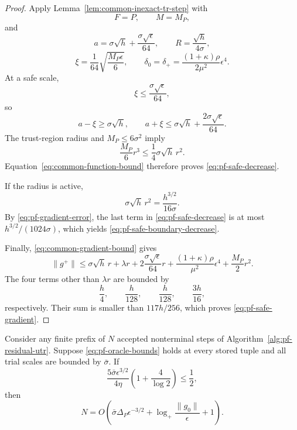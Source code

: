 \begin{proof}
Apply Lemma~\ref{lem:common-inexact-tr-step} with
\[
    F=P,
    \qquad
    M=M_P,
\]
and
\[
    a
    =
    \sigma\sqrt h
    +
    \frac{\sigma\sqrt\epsilon}{64},
    \qquad
    R
    =
    \frac{\sqrt h}{4\sigma},
\]
\[
    \xi
    =
    \frac1{64}
    \sqrt{\frac{M_P\epsilon}{6}},
    \qquad
    \delta_0=\delta_+
    =
    \frac{(1+\kappa)\rho}{2\mu^2}\epsilon^4.
\]
At a safe scale,
\[
    \xi
    \le
    \frac{\sigma\sqrt\epsilon}{64},
\]
so
\[
    a-\xi\ge\sigma\sqrt h,
    \qquad
    a+\xi
    \le
    \sigma\sqrt h
    +
    \frac{2\sigma\sqrt\epsilon}{64}.
\]
The trust-region radius and
$M_P\le6\sigma^2$ imply
\[
    \frac{M_P}{6}r^3
    \le
    \frac14\sigma\sqrt h\,r^2.
\]
Equation~\eqref{eq:common-function-bound} therefore proves
\eqref{eq:pf-safe-decrease}.

If the radius is active,
\[
    \sigma\sqrt h\,r^2
    =
    \frac{h^{3/2}}{16\sigma}.
\]
By \eqref{eq:pf-gradient-error}, the last term in
\eqref{eq:pf-safe-decrease} is at most
$h^{3/2}/(1024\sigma)$, which yields
\eqref{eq:pf-safe-boundary-decrease}.

Finally, \eqref{eq:common-gradient-bound} gives
\[
    \|g^+\|
    \le
    \sigma\sqrt h\,r
    +
    \lambda r
    +
    2\frac{\sigma\sqrt\epsilon}{64}r
    +
    \frac{(1+\kappa)\rho}{\mu^2}\epsilon^4
    +
    \frac{M_P}{2}r^2.
\]
The four terms other than $\lambda r$ are bounded by
\[
    \frac h4,
    \qquad
    \frac h{128},
    \qquad
    \frac h{128},
    \qquad
    \frac{3h}{16},
\]
respectively. Their sum is smaller than $117h/256$, which proves
\eqref{eq:pf-safe-gradient}.
\end{proof}


\begin{lemma}
\label{lem:pf-accepted-accounting}
Consider any finite prefix of $N$ accepted nonterminal steps of
Algorithm~\ref{alg:pf-residual-utr}.
Suppose \eqref{eq:pf-oracle-bounds} holds at every stored tuple and
all trial scales are bounded by $\bar\sigma$.
If
\begin{equation}
    \frac{
        5\bar\sigma\epsilon^{3/2}
    }{
        4\eta
    }
    \left(
        1+\frac4{\log2}
    \right)
    \le
    \frac12,
    \label{eq:pf-absorption-condition}
\end{equation}
then
\begin{equation}
    N
    =
    O\!\left(
        \bar\sigma\Delta_P\epsilon^{-3/2}
        +
        \log_+\frac{\|g_0\|}{\epsilon}
        +1
    \right).
    \label{eq:pf-accepted-bound}
\end{equation}
\end{lemma}

